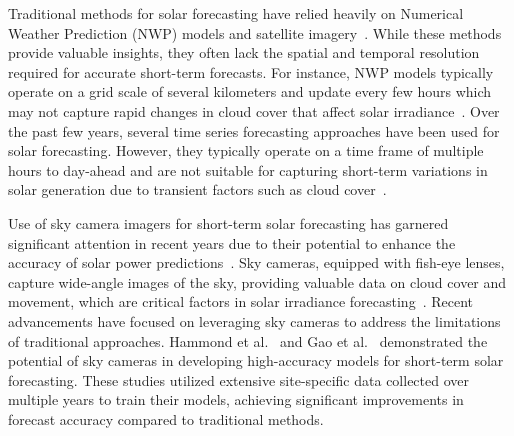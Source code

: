





Traditional methods for solar forecasting have relied heavily on Numerical Weather Prediction (NWP) models and satellite imagery~\cite{markovics2022comparison}. While these methods provide valuable insights, they often lack the spatial and temporal resolution required for accurate short-term forecasts. For instance, NWP models typically operate on a grid scale of several kilometers and update every few hours which may not capture rapid changes in cloud cover that affect solar irradiance~\cite{kostylev2011solar}. Over the past few years, several time series forecasting approaches have been used for solar forecasting. However, they typically operate on a time frame of multiple hours to day-ahead and are not suitable for capturing short-term variations in solar generation due to transient factors such as cloud cover~\cite{iyengar2014solarcast,falope2024three}.  

Use of sky camera imagers for short-term solar forecasting has garnered significant attention in recent years due to their potential to enhance the accuracy of solar power predictions~\cite{hammond2024,wacv2022,yuhao_transfer_learning}. Sky cameras, equipped with fish-eye lenses, capture wide-angle images of the sky, providing valuable data on cloud cover and movement, which are critical factors in solar irradiance forecasting~\cite{dev2019estimating}. Recent advancements have focused on leveraging sky cameras to address the limitations of traditional approaches. Hammond et al.~\cite{hammond2024} and Gao et al.~\cite{wacv2022} demonstrated the potential of sky cameras in developing high-accuracy models for short-term solar forecasting. These studies utilized extensive site-specific data collected over multiple years to train their models, achieving significant improvements in forecast accuracy compared to traditional methods.


